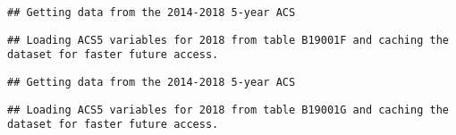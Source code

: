 \documentclass[]{article}
\newenvironment{Shaded}{\begin{snugshade}}{\end{snugshade}}
\newcommand{\DataTypeTok}[1]{\textcolor[rgb]{0.13,0.29,0.53}{#1}}
\newcommand{\DecValTok}[1]{\textcolor[rgb]{0.00,0.00,0.81}{#1}}
\newcommand{\KeywordTok}[1]{\textcolor[rgb]{0.13,0.29,0.53}{\textbf{#1}}}
\newcommand{\NormalTok}[1]{#1}
\newcommand{\OperatorTok}[1]{\textcolor[rgb]{0.81,0.36,0.00}{\textbf{#1}}}
\newcommand{\OtherTok}[1]{\textcolor[rgb]{0.56,0.35,0.01}{#1}}
\newcommand{\StringTok}[1]{\textcolor[rgb]{0.31,0.60,0.02}{#1}}
\begin{document}
\begin{verbatim}
## Getting data from the 2014-2018 5-year ACS
\end{verbatim}

\begin{verbatim}
## Loading ACS5 variables for 2018 from table B19001F and caching the dataset for faster future access.
\end{verbatim}

\begin{Shaded}
\end{Shaded}

\begin{verbatim}
## Getting data from the 2014-2018 5-year ACS
\end{verbatim}

\begin{verbatim}
## Loading ACS5 variables for 2018 from table B19001G and caching the dataset for faster future access.
\end{verbatim}

\begin{Shaded}
\end{Shaded}
\end{document}
